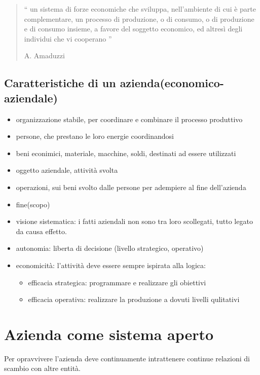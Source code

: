 \begin{quotation}
    `` un sistema di forze economiche che sviluppa,
    nell’ambiente di cui è parte complementare, un processo di
    produzione, o di consumo, o di produzione e di consumo
    insieme, a favore del soggetto economico, ed altresì degli
    individui che vi cooperano ''

A. Amaduzzi
\end{quotation}

\subsection{Caratteristiche di un azienda(economico-aziendale)}

\begin{itemize}
    \item organizzazione stabile, per coordinare e combinare il processo produttivo
    \item persone, che prestano le loro energie coordinandosi
    \item beni econimici, materiale, macchine, soldi, destinati ad essere utilizzati
    \item oggetto aziendale, attività svolta
    \item operazioni, sui beni svolto dalle persone per adempiere al fine dell'azienda
    \item fine(scopo)
    \item visione sistematica:
    i fatti aziendali non sono tra loro scollegati, tutto legato da causa effetto.
    \item autonomia:
    liberta di decisione (livello strategico, operativo)
    \item economicità: l'attività deve essere sempre ispirata alla logica:
    \begin{itemize}
        \item efficacia strategica: programmare e realizzare gli obiettivi
        \item efficacia operativa: realizzare la produzione a dovuti livelli qulitativi
    \end{itemize}
\end{itemize}


\section{Azienda come sistema aperto}

Per opravvivere l'azienda deve continuamente intrattenere continue relazioni di scambio con altre entità.


